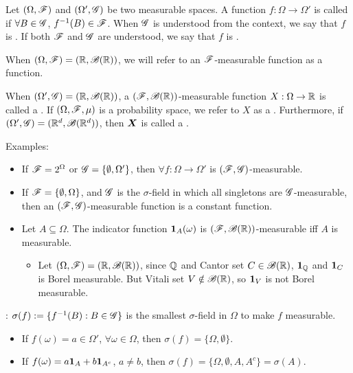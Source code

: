 \documentclass[10pt,a4paper]{article}
\begin{document}
\begin{defbox}
	\begin{definition}\label{def:mea-fun-rv}
		Let $(\Omega,\mathscr{F})$ and $(\Omega',\mathscr{G})$ be two measurable spaces. A function $f:\Omega\to\Omega'$ is called  if $\forall B\in\mathscr{G}$, $f^{-1}(B)\in\mathscr{F}$. When $\mathscr{G}$ is understood from the context, we say that $f$ is . If both $\mathscr{F}$ and $\mathscr{G}$ are understood, we say that $f$ is .     
		
		When $(\Omega,\mathscr{F})=(\mathbb R,\mathscr{B}(\mathbb R))$, we will refer to an $\mathscr{F}$-measurable function as a  function.

		When $(\Omega',\mathscr{G})=(\mathbb R,\mathscr{B}(\mathbb R))$, a $(\mathscr{F},\mathscr{B}(\mathbb R))$-measurable function $X:\Omega\to\mathbb R$ is called a . If $(\Omega,\mathscr{F},\mu)$ is a probability space, we refer to $X$ as a . Furthermore, if $(\Omega',\mathscr{G})=(\mathbb R^d,\mathscr{B}(\mathbb R^d))$, then ${\boldsymbol X}$ is called a .
	\end{definition}
\end{defbox}
Examples:
\begin{itemize}
	\item If $\mathscr{F}=2^{\Omega}$ or $\mathscr{G}=\{\emptyset,\Omega'\}$, then $\forall f:\Omega\to\Omega'$ is $(\mathscr{F},\mathscr{G})$-measurable.
	\item If $\mathscr{F}=\{\emptyset,\Omega\}$, and $\mathscr{G}$ is the $\sigma$-field in which all singletons are $\mathscr{G}$-measurable, then an $(\mathscr{F},\mathscr{G})$-measurable function is a constant function.        
	\item Let $A\subseteq\Omega$. The indicator function ${\boldsymbol 1}_A(\omega)$ is $(\mathscr{F},\mathscr{B}(\mathbb R))$-measurable iff $A$ is measurable. 
	\begin{itemize}
		\item Let $(\Omega,\mathscr{F})=(\mathbb R,\mathscr{B}(\mathbb R))$, since $\mathbb Q$ and Cantor set $C\in\mathscr{B}(\mathbb R)$, ${\boldsymbol 1}_{\mathbb Q}$ and ${\boldsymbol 1}_{C}$ is Borel measurable. But Vitali set $V\notin\mathscr{B}(\mathbb R)$, so ${\boldsymbol 1}_V$ is not Borel measurable.       
	\end{itemize}
\end{itemize}

\noindent {}: $\sigma(f):=\{f^{-1}(B):B\in\mathscr{G}\}$ is the smallest $\sigma$-field in $\Omega$ to make $f$ measurable.   
\begin{itemize}
	\item If $f(\omega)=a\in\Omega'$, $\forall \omega\in\Omega$, then $\sigma(f)=\{\Omega,\emptyset\}$.
	\item If $f(\omega)=a{\boldsymbol 1}_{A}+b{\boldsymbol 1}_{A^c}$, $a\neq b$, then $\sigma(f)=\{\Omega,\emptyset,A,A^c\}=\sigma(A)$.       
\end{itemize}
\end{document}
